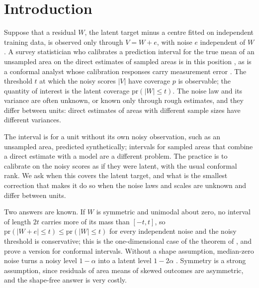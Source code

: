 \documentclass[12pt]{article}
\renewcommand{\theequation}{\thesection\arabic{equation}}
\theoremstyle{definition}
\newcommand{\pr}{\mathrm{pr}}
\begin{document}
\def\thefigure{\arabic{figure}}
\def\thetable{\arabic{table}}
\renewcommand{\theequation}{\thesection.\arabic{equation}}

\fontsize{12}{14pt plus.8pt minus .6pt}\selectfont

\section{Introduction}\label{sec:intro}

Suppose that a residual $W$, the latent target minus a centre fitted on independent training data, is observed only through $V = W + e$, with noise $e$ independent of $W$. A survey statistician who calibrates a prediction interval for the true mean of an unsampled area on the direct estimates of sampled areas is in this position \citep{fay1979, rao2015}, as is a conformal analyst whose calibration responses carry measurement error \citep{einbinder2024, cohen2025}. The threshold $t$ at which the noisy scores $|V|$ have coverage $p$ is observable; the quantity of interest is the latent coverage $\pr(|W| \le t)$. The noise law and its variance are often unknown, or known only through rough estimates, and they differ between units: direct estimates of areas with different sample sizes have different variances.

The interval is for a unit without its own noisy observation, such as an unsampled area, predicted synthetically; intervals for sampled areas that combine a direct estimate with a model are a different problem. The practice is to calibrate on the noisy scores as if they were latent, with the usual conformal rank. We ask when this covers the latent target, and what is the smallest correction that makes it do so when the noise laws and scales are unknown and differ between units.

Two answers are known. If $W$ is symmetric and unimodal about zero, no interval of length $2t$ carries more of its mass than $[-t, t]$, so $\pr(|W + e| \le t) \le \pr(|W| \le t)$ for every independent noise and the noisy threshold is conservative; this is the one-dimensional case of the theorem of \citet{anderson1955}, and \citet[Proposition~1]{einbinder2024} prove a version for conformal intervals. Without a shape assumption, median-zero noise turns a noisy level $1 - \alpha$ into a latent level $1 - 2\alpha$ \citep[Proposition~2.3]{guille2024}. Symmetry is a strong assumption, since residuals of area means of skewed outcomes are asymmetric, and the shape-free answer is very costly.
\end{document}
